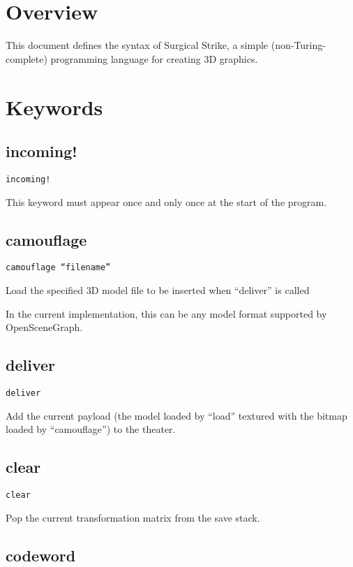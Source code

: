 \documentclass[12pt]{article}
\begin{document}
\maketitle

\section{Overview}

This document defines the syntax of Surgical Strike, a simple (non-Turing-complete) programming language for creating 3D graphics.

\section{Keywords}

\subsection{incoming!}

\texttt{incoming!}

This keyword must appear once and only once at the start of the program.

\subsection{camouflage}

\texttt{camouflage ``filename''}

Load the specified 3D model file to be inserted when ``deliver'' is called

In the current implementation, this can be any model format supported by OpenSceneGraph.

\subsection{deliver}

\texttt{deliver}

Add the current payload (the model loaded by ``load'' textured with the bitmap loaded by ``camouflage'') to the theater.

\subsection{clear}

\texttt{clear}

Pop the current transformation matrix from the save stack. 

\subsection{codeword}
\end{document}
